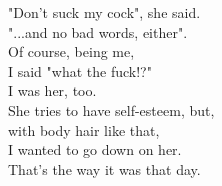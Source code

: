 "Don't suck my cock", she said.\\
"...and no bad words, either". \\
Of course, being me, \\
I said "what the fuck!?" \\
I was her, too.\\
She tries to have self-esteem, but,\\
with body hair like that, \\
I wanted to go down on her.\\
That's the way it was that day.\\


